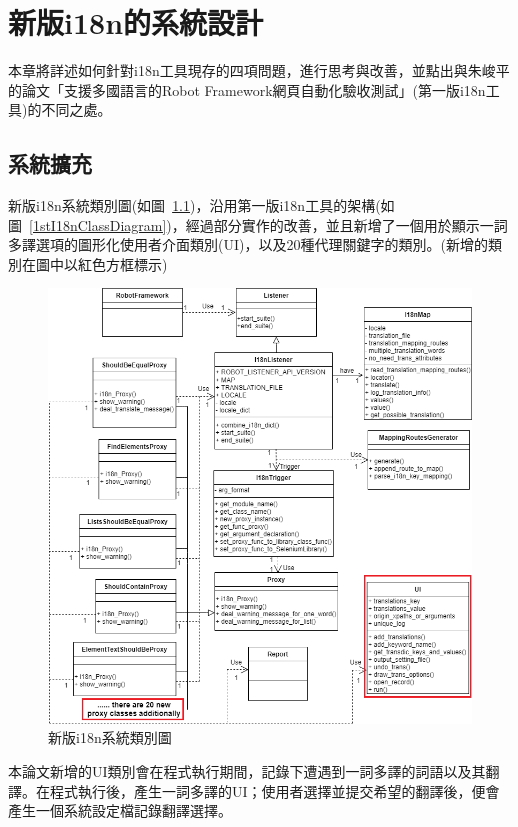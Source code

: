 \chapter{新版i18n的系統設計}
本章將詳述如何針對i18n工具現存的四項問題，進行思考與改善，並點出與朱峻平的論文「支援多國語言的Robot Framework網頁自動化驗收測試」(第一版i18n工具)\cite{i18n}的不同之處。

\section{系統擴充}
新版i18n系統類別圖(如圖~\ref{新版i18n系統類別圖})，沿用第一版i18n工具的架構(如圖~\ref{1stI18nClassDiagram})，經過部分實作的改善，並且新增了一個用於顯示一詞多譯選項的圖形化使用者介面類別(UI)，以及20種代理關鍵字的類別。(新增的類別在圖中以紅色方框標示)

\begin{figure}[H]
\flushleft
\includegraphics[width= 1.1\textwidth]{../UML/i18n class diagram-i18n正式版 class diagram .png}
\caption{新版i18n系統類別圖}
\label{新版i18n系統類別圖}
\end{figure}

本論文新增的UI類別會在程式執行期間，記錄下遭遇到一詞多譯的詞語以及其翻譯。在程式執行後，產生一詞多譯的UI；使用者選擇並提交希望的翻譯後，便會產生一個系統設定檔記錄翻譯選擇。
\hspace*{\fill} \\

